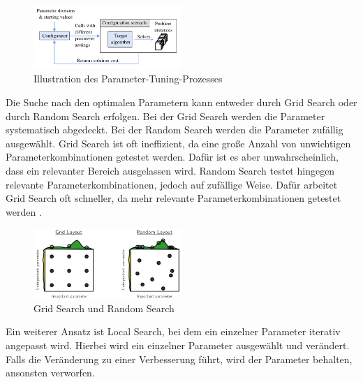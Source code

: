 \begin{figure}[h]
    \centering
    \includegraphics[width=0.5\textwidth]{figures/Automated Parameter Tuning [kotth23pr].PNG}
    \caption{Illustration des Parameter-Tuning-Prozesses \cite[34]{kotth23pr}}
    \label{fig:bild}
\end{figure}

Die Suche nach den optimalen Parametern kann entweder durch Grid Search oder
durch Random Search erfolgen. Bei der Grid Search werden die Parameter
systematisch abgedeckt. Bei der Random Search werden die Parameter zufällig
ausgewählt. Grid Search ist oft ineffizient, da eine große Anzahl von
unwichtigen Parameterkombinationen getestet werden. Dafür ist es aber
unwahrscheinlich, dass ein relevanter Bereich ausgelassen wird. Random Search
testet hingegen relevante Parameterkombinationen, jedoch auf zufällige Weise.
Dafür arbeitet Grid Search oft schneller, da mehr relevante
Parameterkombinationen getestet werden \cite[39]{kotth23pr}.

\begin{figure}[h]
    \centering
    \includegraphics[width=0.5\textwidth]{figures/Grid Search vs. Random Search [kotth23pr].PNG}
    \caption{Grid Search und Random Search \cite[39]{kotth23pr}}
    \label{fig:bild}
\end{figure}

Ein weiterer Ansatz ist Local Search, bei dem ein einzelner Parameter iterativ
angepasst wird. Hierbei wird ein einzelner Parameter ausgewählt und verändert.
Falls die Veränderung zu einer Verbesserung führt, wird der Parameter behalten,
ansonsten verworfen.


